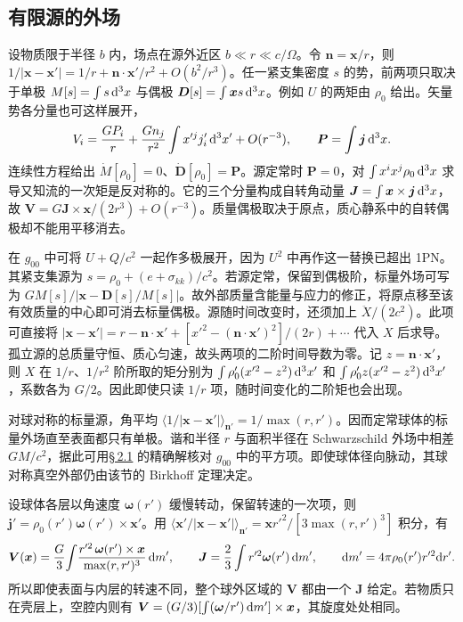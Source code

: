 \subsection{有限源的外场}\label{sec:pn-source-moments}

设物质限于半径 $b$ 内，场点在源外近区 $b\ll r\ll c/\Omega$。令 $\bm n=\bm x/r$，则 $1/|\bm x-\bm x'|=1/r+\bm n\cdot\bm x'/r^2+O(b^2/r^3)$。任一紧支集密度 $s$ 的势，前两项只取决于单极 $M[s]=\int s\,\dd^3x$ 与偶极 $\bm D[s]=\int\bm x s\,\dd^3x$。例如 $U$ 的两矩由 $\rho_0$ 给出。矢量势各分量也可这样展开，
\[
 V_i=\frac{GP_i}{r}+\frac{G n_j}{r^2}\int x'^j j_i'\,\dd^3x'+O(r^{-3}),
 \qquad \bm P=\int\bm j\,\dd^3x .
\]
连续性方程给出 $\dot M[\rho_0]=0$、$\dot{\bm D}[\rho_0]=\bm P$。源定常时 $\bm P=0$，对 $\int x^ix^j\rho_0\,\dd^3x$ 求导又知流的一次矩是反对称的。它的三个分量构成自转角动量 $\bm J=\int\bm x\times\bm j\,\dd^3x$，故 $\bm V=G\bm J\times\bm x/(2r^3)+O(r^{-3})$。质量偶极取决于原点，质心静系中的自转偶极却不能用平移消去。

在 $g_{00}$ 中可将 $U+Q/c^2$ 一起作多极展开，因为 $U^2$ 中再作这一替换已超出 1PN。其紧支集源为 $s=\rho_0+(e+\sigma_{kk})/c^2$。若源定常，保留到偶极阶，标量外场可写为 $G M[s]/|\bm x-\bm D[s]/M[s]|$。故外部质量含能量与应力的修正，将原点移至该有效质量的中心即可消去标量偶极。源随时间改变时，还须加上 $\ddot X/(2c^2)$。此项可直接将 $|\bm x-\bm x'|=r-\bm n\cdot\bm x'+[x'^2-(\bm n\cdot\bm x')^2]/(2r)+\cdots$ 代入 $X$ 后求导。孤立源的总质量守恒、质心匀速，故头两项的二阶时间导数为零。记 $z=\bm n\cdot\bm x'$，则 $X$ 在 $1/r$、$1/r^2$ 阶所取的矩分别为 $\int\rho_0'(x'^2-z^2)\,\dd^3x'$ 和 $\int\rho_0' z(x'^2-z^2)\,\dd^3x'$，系数各为 $G/2$。因此即使只读 $1/r$ 项，随时间变化的二阶矩也会出现。

对球对称的标量源，角平均 $\langle1/|\bm x-\bm x'|\rangle_{\bm n'}=1/\max(r,r')$。因而定常球体的标量外场直至表面都只有单极。谐和半径 $r$ 与面积半径在 Schwarzschild 外场中相差 $GM/c^2$，据此可用\hyperlink{section.2.1}{\S\,2.1} 的精确解核对 $g_{00}$ 中的平方项。即使球体径向脉动，其球对称真空外部仍由该节的 Birkhoff 定理决定。

设球体各层以角速度 $\bm\omega(r')$ 缓慢转动，保留转速的一次项，则 $\bm j'=\rho_0(r')\bm\omega(r')\times\bm x'$。用 $\langle\bm x'/|\bm x-\bm x'|\rangle_{\bm n'}=\bm x r'^2/[3\max(r,r')^3]$ 积分，有
\[
 \bm V(\bm x)=\frac{G}{3}\!\int\!
 \frac{r'^2\,\bm\omega(r')\times\bm x}{\max(r,r')^3}\,\dd m',
 \qquad
 \bm J=\frac23\int r'^2\bm\omega(r')\,\dd m',\qquad
 \dd m'=4\pi\rho_0(r')r'^2\dd r'.
\]
所以即使表面与内层的转速不同，整个球外区域的 $\bm V$ 都由一个 $\bm J$ 给定。若物质只在壳层上，空腔内则有 $\bm V=(G/3)[\int(\bm\omega/r')\,\dd m']\times\bm x$，其旋度处处相同。

